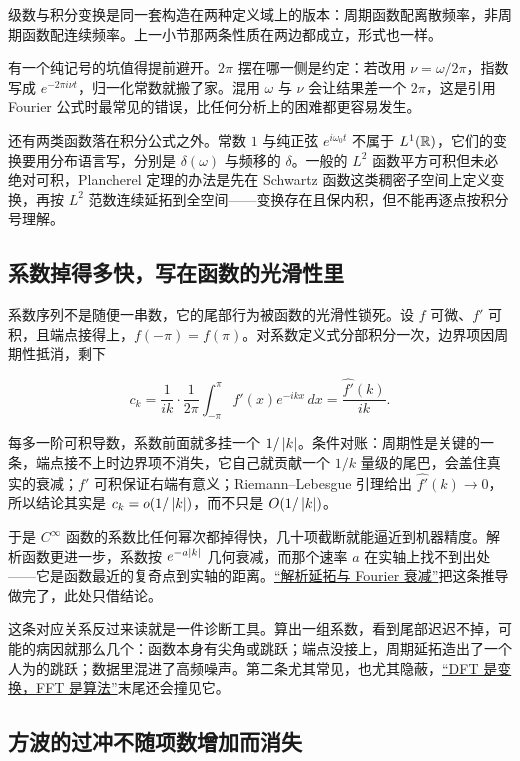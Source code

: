 级数与积分变换是同一套构造在两种定义域上的版本：周期函数配离散频率，非周期函数配连续频率。上一小节那两条性质在两边都成立，形式也一样。

有一个纯记号的坑值得提前避开。\(2\pi\) 摆在哪一侧是约定：若改用 \(\nu=\omega/2\pi\)，指数写成 \(e^{-2\pi i\nu t}\)，归一化常数就搬了家。混用 \(\omega\) 与 \(\nu\) 会让结果差一个 \(2\pi\)，这是引用 Fourier 公式时最常见的错误，比任何分析上的困难都更容易发生。

还有两类函数落在积分公式之外。常数 \(1\) 与纯正弦 \(e^{i\omega_0t}\) 不属于 \(L^1(\mathbb{R})\)，它们的变换要用分布语言写，分别是 \(\delta(\omega)\) 与频移的 \(\delta\)。一般的 \(L^2\) 函数平方可积但未必绝对可积，Plancherel 定理的办法是先在 Schwartz 函数这类稠密子空间上定义变换，再按 \(L^2\) 范数连续延拓到全空间——变换存在且保内积，但不能再逐点按积分号理解。

\subsection{系数掉得多快，写在函数的光滑性里}

系数序列不是随便一串数，它的尾部行为被函数的光滑性锁死。设 \(f\) 可微、\(f'\) 可积，且端点接得上，\(f(-\pi)=f(\pi)\)。对系数定义式分部积分一次，边界项因周期性抵消，剩下

\[
c_k=\frac{1}{ik}\cdot\frac{1}{2\pi}\int_{-\pi}^{\pi}f'(x)e^{-ikx}\,dx=\frac{\widehat{f'}(k)}{ik}.
\]

每多一阶可积导数，系数前面就多挂一个 \(1/\left|k\right|\)。条件对账：周期性是关键的一条，端点接不上时边界项不消失，它自己就贡献一个 \(1/k\) 量级的尾巴，会盖住真实的衰减；\(f'\) 可积保证右端有意义；Riemann--Lebesgue 引理给出 \(\widehat{f'}(k)\to0\)，所以结论其实是 \(c_k=o(1/\left|k\right|)\)，而不只是 \(O(1/\left|k\right|)\)。

于是 \(C^\infty\) 函数的系数比任何幂次都掉得快，几十项截断就能逼近到机器精度。解析函数更进一步，系数按 \(e^{-a\left|k\right|}\) 几何衰减，而那个速率 \(a\) 在实轴上找不到出处——它是函数最近的复奇点到实轴的距离。\hyperref[sec:08-Numerical-Analysis/09-Complex-Analysis-and-Residues/01]{``解析延拓与 Fourier 衰减''}把这条推导做完了，此处只借结论。

这条对应关系反过来读就是一件诊断工具。算出一组系数，看到尾部迟迟不掉，可能的病因就那么几个：函数本身有尖角或跳跃；端点没接上，周期延拓造出了一个人为的跳跃；数据里混进了高频噪声。第二条尤其常见，也尤其隐蔽，\hyperref[sec:08-Numerical-Analysis/08-Fourier-and-Spectral-Methods/03]{``DFT 是变换，FFT 是算法''}末尾还会撞见它。

\subsection{方波的过冲不随项数增加而消失}

